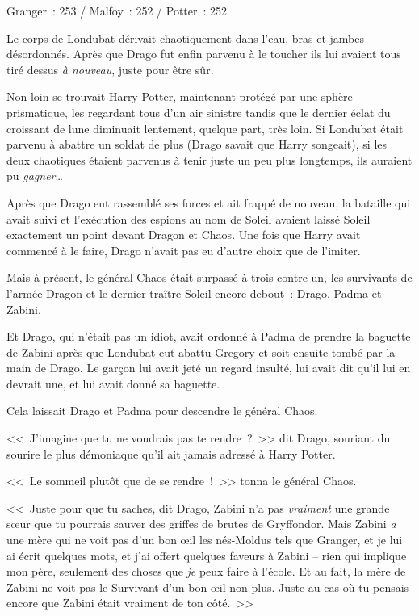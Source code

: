 \later

Granger~: 253 / Malfoy~: 252 / Potter~: 252

Le corps de Londubat dérivait chaotiquement dans l'eau, bras et jambes désordonnés. Après que Drago fut enfin parvenu à le toucher ils lui avaient tous tiré dessus \emph{à nouveau}, juste pour être sûr.

Non loin se trouvait Harry Potter, maintenant protégé par une sphère prismatique, les regardant tous d'un air sinistre tandis que le dernier éclat du croissant de lune diminuait lentement, quelque part, très loin. Si Londubat était parvenu à abattre un soldat de plus (Drago savait que Harry songeait), si les deux chaotiques étaient parvenus à tenir juste un peu plus longtemps, ils auraient pu \emph{gagner}…

Après que Drago eut rassemblé ses forces et ait frappé de nouveau, la bataille qui avait suivi et l'exécution des espions au nom de Soleil avaient laissé Soleil exactement un point devant Dragon et Chaos. Une fois que Harry avait commencé à le faire, Drago n'avait pas eu d'autre choix que de l'imiter.

Mais à présent, le général Chaos était surpassé à trois contre un, les survivants de l'armée Dragon et le dernier traître Soleil encore debout~: Drago, Padma et Zabini.

Et Drago, qui n'était pas un idiot, avait ordonné à Padma de prendre la baguette de Zabini après que Londubat eut abattu Gregory et soit ensuite tombé par la main de Drago. Le garçon lui avait jeté un regard insulté, lui avait dit qu'il lui en devrait une, et lui avait donné sa baguette.

Cela laissait Drago et Padma pour descendre le général Chaos.

<<~J'imagine que tu ne voudrais pas te rendre~?~>> dit Drago, souriant du sourire le plus démoniaque qu'il ait jamais adressé à Harry Potter.

<<~Le sommeil plutôt que de se rendre~!~>> tonna le général Chaos.

<<~Juste pour que tu saches, dit Drago, Zabini n'a pas \emph{vraiment} une grande sœur que tu pourrais sauver des griffes de brutes de Gryffondor. Mais Zabini \emph{a} une mère qui ne voit pas d'un bon œil les nés-Moldus tels que Granger, et je lui ai écrit quelques mots, et j'ai offert quelques faveurs à Zabini -- rien qui implique mon père, seulement des choses que \emph{je} peux faire à l'école. Et au fait, la mère de Zabini ne voit pas le Survivant d'un bon œil non plus. Juste au cas où tu pensais encore que Zabini était vraiment de ton côté.~>>

